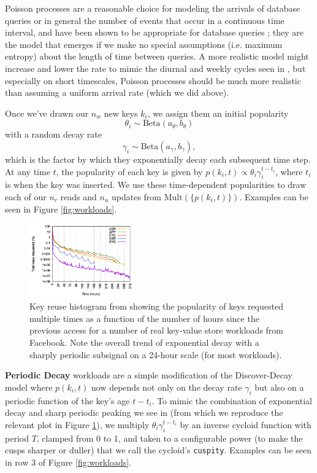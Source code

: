 \documentclass{sig-alternate-05-2015}
\begin{document}
Poisson processes are a reasonable choice for modeling the arrivals of database
queries or in general the number of events that occur in a continuous time
interval, and have been shown to be appropriate for database queries
\cite{poisson-db1,poisson-db2,poisson-db3}; they are the model that emerges
if we make no special assumptions (i.e. maximum entropy) about the
length of time between queries.  A more realistic model might increase and
lower the rate to mimic the diurnal and weekly cycles seen in
\cite{characterizing-memcached}, but especially on short timescales, Poisson
processes should be much more realistic than assuming a uniform arrival rate
(which we did above).

Once we've drawn our $n_w$ new keys $k_i$, we assign them an initial popularity
$$
\theta_{i} \sim \textrm{Beta}(a_\theta,b_\theta)
$$
\noindent with a random decay rate
$$
\gamma_i \sim \textrm{Beta}(a_\gamma,b_\gamma),
$$
which is the factor by which they exponentially decay each subsequent time
step. At any time $t$, the popularity of each key is given by $p(k_i,t) \propto
\theta_i\gamma_i^{t-t_i}$, where $t_i$ is when the key was inserted. We use
these time-dependent popularities to draw each of our $n_r$ reads and $n_u$
updates from $\textrm{Mult}(\{p(k_i,t)\})$. Examples can be seen in Figure
\ref{fig:workloads}.

\begin{figure}[!htb]
\begin{center}
\includegraphics[width=0.4\textwidth]{cuspity.png}
\end{center}
\caption{Key reuse histogram from \cite{characterizing-memcached} showing the
  popularity of keys requested multiple times as a function of the number of
  hours since the previous access for a number of real key-value store
  workloads from Facebook. Note the overall trend of exponential decay with a
  sharply periodic subsignal on a 24-hour scale (for most workloads).}
\label{fig:memcached-decay}
\end{figure}

\textbf{Periodic Decay} workloads are a simple modification of the
Discover-Decay model where $p(k_i,t)$ now depends not only on the decay rate
$\gamma_i$ but also on a periodic function of the key's age $t-t_i$.  To mimic
the combination of exponential decay and sharp periodic peaking we see in
\cite{characterizing-memcached} (from which we reproduce the relevant plot in
Figure \ref{fig:memcached-decay}), we multiply $\theta_i\gamma_i^{t-t_i}$ by an
inverse cycloid function with period $T$, clamped from 0 to 1, and taken to a
configurable power (to make the cusps sharper or duller) that we call the
cycloid's \texttt{cuspity}. Examples can be seen in row 3 of Figure
\ref{fig:workloads}.
\end{document}
